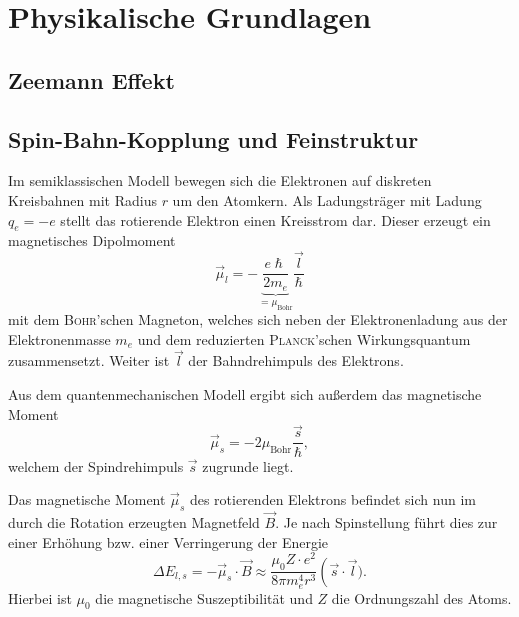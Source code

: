 \documentclass[../bericht.tex]{subfiles}
\begin{document}
  \chapter{Physikalische Grundlagen}

    \section{Zeemann Effekt}
    \label{sec:zeemann}


    \section{Spin-Bahn-Kopplung und Feinstruktur}
    \label{sec:feinstruktur}

      Im semiklassischen Modell bewegen sich die Elektronen auf diskreten Kreisbahnen mit Radius $r$ um den Atomkern. Als Ladungsträger mit Ladung $q_e=-e$ stellt das rotierende Elektron einen Kreisstrom dar. Dieser erzeugt ein magnetisches Dipolmoment
      \begin{equation*}
        \vec{\mu}_l=-\underbrace{\frac{e\hslash}{2m_e}}_{=\mu_\mathrm{Bohr}}\frac{\vec{l}}{\hslash}
      \end{equation*}
      mit dem \textsc{Bohr}'schen Magneton, welches sich neben der Elektronenladung aus der Elektronenmasse $m_e$ und dem reduzierten \textsc{Planck}'schen Wirkungsquantum zusammensetzt. Weiter ist $\vec{l}$ der Bahndrehimpuls des Elektrons.

      Aus dem quantenmechanischen Modell ergibt sich außerdem das magnetische Moment
      \begin{equation*}
        \vec{\mu}_s=-2\mu_\mathrm{Bohr}\frac{\vec{s}}{\hslash},
      \end{equation*}
      welchem der Spindrehimpuls $\vec{s}$ zugrunde liegt.

      Das magnetische Moment $\vec{\mu}_s$ des rotierenden Elektrons befindet sich nun im durch die Rotation erzeugten Magnetfeld $\vec{B}$. Je nach Spinstellung führt dies zur einer Erhöhung bzw. einer Verringerung der Energie
      \begin{equation}
        \Delta E_{l,s}=-\vec{\mu}_s\cdot \vec{B}\approx \frac{\mu_0Z\cdot e^2}{8\pi m_e^4r^3}\left( \vec{s}\cdot \vec{l}).
        \label{eq:feinstruktur-1}
      \end{equation}
      Hierbei ist $\mu_0$ die magnetische Suszeptibilität und $Z$ die Ordnungszahl des Atoms.
\end{document}

